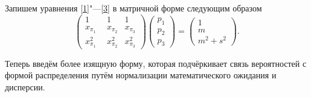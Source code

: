 \documentclass[12pt]{article}
\begin{document}
		Запишем уравнения \eqref{1}"---\eqref{3} в матричной форме следующим образом
	\[\begin{pmatrix} 
		1&1&1\\ 
		x_{\pi_{1}} &  x_{\pi_{2}}  & x_{\pi_{3}} \\ 
		x_{\pi_{1}}^2~~&x_{\pi_{2}}^2  &x_{\pi_{3}}^2
	\end{pmatrix}
	\begin{pmatrix}p_{1}\\p_{2}\\ p_{3}\end{pmatrix}= \begin{pmatrix}1\\m\\m^{2}+s^{2}\end{pmatrix}.\]
	
	Теперь введём более изящную форму, которая подчёркивает связь вероятностей с формой распределения путём нормализации математического ожидания и дисперсии.
	
\end{document}
